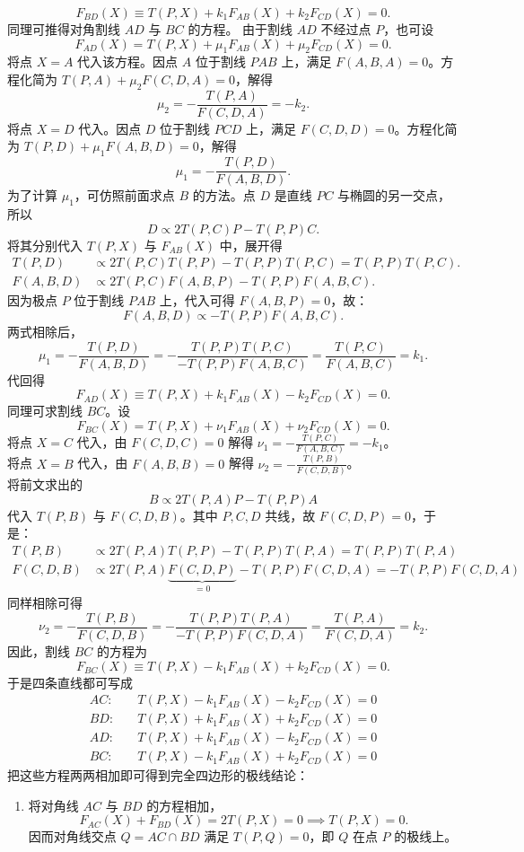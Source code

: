\begin{solution}
\[ F_{BD}(X) \equiv T(P,X) + k_1 F_{AB}(X) + k_2 F_{CD}(X) = 0. \]
同理可推得对角割线 $AD$ 与 $BC$ 的方程。
由于割线 $AD$ 不经过点 $P$，也可设
\[ F_{AD}(X) = T(P,X) + \mu_1 F_{AB}(X) + \mu_2 F_{CD}(X) = 0. \]
将点 $X = A$ 代入该方程。因点 $A$ 位于割线 $PAB$ 上，满足 $F(A,B,A) = 0$。方程化简为 $T(P,A) + \mu_2 F(C,D,A) = 0$，解得
\[ \mu_2 = -\frac{T(P,A)}{F(C,D,A)} = -k_2. \]
将点 $X = D$ 代入。因点 $D$ 位于割线 $PCD$ 上，满足 $F(C,D,D) = 0$。方程化简为 $T(P,D) + \mu_1 F(A,B,D) = 0$，解得
\[ \mu_1 = -\frac{T(P,D)}{F(A,B,D)}. \]
为了计算 $\mu_1$，可仿照前面求点 $B$ 的方法。点 $D$ 是直线 $PC$ 与椭圆的另一交点，所以
\[
D \propto 2T(P,C)P - T(P,P)C.
\]
将其分别代入 $T(P,X)$ 与 $F_{AB}(X)$ 中，展开得
\begin{align*}
T(P,D) &\propto 2T(P,C)T(P,P) - T(P,P)T(P,C) = T(P,P)T(P,C). \\
F(A,B,D) &\propto 2T(P,C)F(A,B,P) - T(P,P)F(A,B,C).
\end{align*}
因为极点 $P$ 位于割线 $PAB$ 上，代入可得 $F(A,B,P) = 0$，故：
\[ F(A,B,D) \propto -T(P,P)F(A,B,C). \]
两式相除后，
\[ \mu_1 = -\frac{T(P,D)}{F(A,B,D)} = -\frac{T(P,P)T(P,C)}{-T(P,P)F(A,B,C)} = \frac{T(P,C)}{F(A,B,C)} = k_1. \]
代回得
\[ F_{AD}(X) \equiv T(P,X) + k_1 F_{AB}(X) - k_2 F_{CD}(X) = 0. \]
同理可求割线 $BC$。设
\[
F_{BC}(X) = T(P,X) + \nu_1 F_{AB}(X) + \nu_2 F_{CD}(X) = 0.
\]
将点 $X = C$ 代入，由 $F(C,D,C) = 0$ 解得 $\nu_1 = -\frac{T(P,C)}{F(A,B,C)} = -k_1$。\\
将点 $X = B$ 代入，由 $F(A,B,B) = 0$ 解得 $\nu_2 = -\frac{T(P,B)}{F(C,D,B)}$。\\
将前文求出的
\[
B \propto 2T(P,A)P - T(P,P)A
\]
代入 $T(P,B)$ 与 $F(C,D,B)$。其中 $P,C,D$ 共线，故 $F(C,D,P)=0$，于是：
\begin{align*}
T(P,B) &\propto 2T(P,A)T(P,P) - T(P,P)T(P,A) = T(P,P)T(P,A) \\
F(C,D,B) &\propto 2T(P,A)\underbrace{F(C,D,P)}_{=0} - T(P,P)F(C,D,A) = -T(P,P)F(C,D,A)
\end{align*}
同样相除可得
\[ \nu_2 = -\frac{T(P,B)}{F(C,D,B)} = -\frac{T(P,P)T(P,A)}{-T(P,P)F(C,D,A)} = \frac{T(P,A)}{F(C,D,A)} = k_2. \]
因此，割线 $BC$ 的方程为
\[ F_{BC}(X) \equiv T(P,X) - k_1 F_{AB}(X) + k_2 F_{CD}(X) = 0. \]
于是四条直线都可写成
\begin{align*}
    AC:&\quad T(P,X) - k_1 F_{AB}(X) - k_2 F_{CD}(X) = 0 \\
    BD:&\quad T(P,X) + k_1 F_{AB}(X) + k_2 F_{CD}(X) = 0 \\
    AD:&\quad T(P,X) + k_1 F_{AB}(X) - k_2 F_{CD}(X) = 0 \\
    BC:&\quad T(P,X) - k_1 F_{AB}(X) + k_2 F_{CD}(X) = 0 
\end{align*}
把这些方程两两相加即可得到完全四边形的极线结论：
\begin{enumerate}
    \item 将对角线 $AC$ 与 $BD$ 的方程相加，
    \[ F_{AC}(X) + F_{BD}(X) = 2T(P,X) = 0 \implies T(P,X) = 0. \]
    因而对角线交点 $Q = AC \cap BD$ 满足 $T(P,Q) = 0$，即 $Q$ 在点 $P$ 的极线上。
    

\end{enumerate}
\end{solution}

